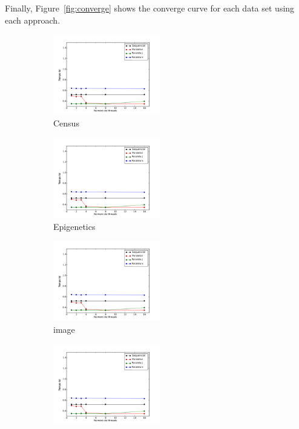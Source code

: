 	Finally, Figure~\ref{fig:converge} shows the converge curve for each data set using each approach.
	\begin{figure}[H]
		\centering
		\begin{subfigure}{.3\textwidth}
			\centering
			\includegraphics[height=3.5cm]{images/census}
			\caption{Census}
			\label{fig:census}
		\end{subfigure}
		\begin{subfigure}{.3\textwidth}
			\centering
			\includegraphics[height=3.5cm]{images/epigenetics}
			\caption{Epigenetics}
			\label{fig:epigenetics}
		\end{subfigure}
		\begin{subfigure}{.3\textwidth}
			\centering
			\includegraphics[height=3.5cm]{images/image}
			\caption{image}
			\label{fig:image}
		\end{subfigure}
		\begin{subfigure}{.3\textwidth}
			\centering
			\includegraphics[height=3.5cm]{images/letter}

\end{subfigure}
\end{figure}
